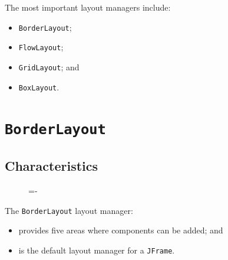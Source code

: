 \documentclass[a4paper]{systems-software}
\begin{document}
The most important layout managers include:
\begin{itemize}
	\item \texttt{BorderLayout};
	\item \texttt{FlowLayout};
	\item \texttt{GridLayout}; and
	\item \texttt{BoxLayout}.
\end{itemize}

\section*{\texttt{BorderLayout}}

\subsection*{Characteristics}

\begin{figure}[H]
	\lineskip=-\fboxrule
\end{figure}

The \texttt{BorderLayout} layout manager:
\begin{itemize}
	\item provides five areas where components can be added; and
	\item is the default layout manager for a \texttt{JFrame}.
\end{itemize}
\end{document}
